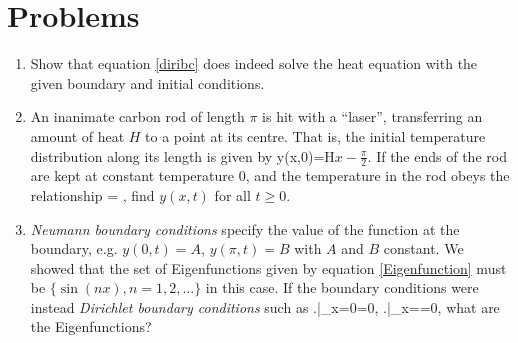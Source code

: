 \documentclass[12pt]{book}
\begin{document}
\section{Problems}

\begin{enumerate}
  \item
    Show that equation \eqref{diribc} does indeed solve the heat equation
    with the given boundary and initial conditions.
  \item
    An inanimate carbon rod of length $\pi$ is hit with a ``laser'',
    transferring an amount of heat $H$ to a point at its centre. That is, the
    initial temperature distribution along its length is given by
    \bee
    y(x,0)=H\delta\(x-\frac{\pi}{2}\).
    \eee
    If the ends of the rod are kept at constant temperature $0$, and the
    temperature in the rod obeys the relationship
    \bee
     = \beta {},
    \eee
    find $y(x,t)$ for all $t\geq 0$.
  \item
    \emph{Neumann boundary conditions} specify the value of the function at
    the boundary, e.g. $y(0,t)=A$, $y(\pi,t)=B$ with $A$ and $B$ constant.
    We showed that the set of Eigenfunctions given by equation
    \eqref{Eigenfunction} must be $\{\sin(nx),n=1,2,\dots\}$ in this case.
    If the boundary conditions were instead \emph{Dirichlet boundary conditions}
    such as
    \bee
    \left.\right|_{x=0}=0, \qquad
        \left.\right|_{x=\pi}=0,
    \eee
    what are the Eigenfunctions?


\end{enumerate}
\end{document}
